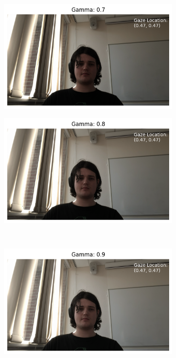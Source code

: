 \documentclass{report}
\begin{document}
\begin{figure}[h]
\begin{subfigure}{0.4\textwidth}
    \end{subfigure}\\[1em]
    \begin{subfigure}{0.4\textwidth}
      \centering
      \includegraphics[width=\linewidth]{../assets/lighting-experiment/gamma-0.7.png}
    \end{subfigure}%
    \begin{subfigure}{0.4\textwidth}
      \centering
      \includegraphics[width=\linewidth]{../assets/lighting-experiment/gamma-0.8.png}
    \end{subfigure}\\[1em]
    \begin{subfigure}{0.4\textwidth}
      \centering
      \includegraphics[width=\linewidth]{../assets/lighting-experiment/gamma-0.9.png}

\end{subfigure}
\end{figure}
\end{document}

